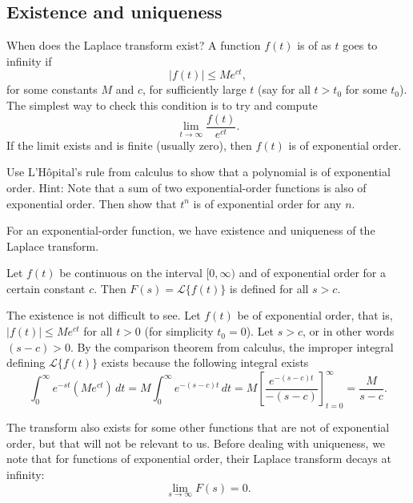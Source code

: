 \subsection{Existence and uniqueness}

When does the Laplace transform exist?  A function $f(t)$ is of
\emph{} as $t$ goes to infinity if
\begin{equation*}
\lvert f(t) \rvert \leq M e^{ct} ,
\end{equation*}
for some constants $M$ and $c$, for
sufficiently large $t$ (say for all $t > t_0$ for some $t_0$).  The simplest
way to check this condition is to try and compute
\begin{equation*}
\lim_{t\to \infty} \frac{f(t)}{e^{ct}} .
\end{equation*}
If the limit exists and is finite (usually zero), then $f(t)$ is of
exponential order.

\begin{exercise}
Use L'H\^{o}pital's rule from calculus to show that a polynomial is of
exponential order.  Hint: Note that a sum of two exponential-order functions
is also of exponential order.  Then show that $t^n$ is of exponential order
for any $n$.
\end{exercise}

For an exponential-order function, we have existence and uniqueness of the
Laplace transform.

\begin{theorem}[Existence]
Let $f(t)$ be continuous on the interval $[0,\infty)$ and of exponential order for a certain
constant $c$.  Then $F(s) = \mathcal{L} \bigl\{ f(t) \bigr\}$ is defined for
all $s > c$.
\end{theorem}

The existence is not difficult to see.  Let $f(t)$ be of exponential order,
that is, $\lvert f(t) \rvert \leq M e^{ct}$ for all $t > 0$ (for simplicity $t_0 = 0$).
Let $s > c$, or in other words $(s-c) > 0$.
By the comparison theorem from calculus, the improper integral defining
$\mathcal{L} \bigl\{ f(t) \bigr\}$ exists because the following integral exists
\begin{equation*}
\int_0^\infty e^{-st} ( M e^{ct} ) \,dt
=
M \int_0^\infty e^{-(s-c)t} \,dt = M \left[ \frac{e^{-(s-c)t}}{-(s-c)}
\right]_{t=0}^\infty = \frac{M}{s-c} .
\end{equation*}

The transform also exists for some other functions
that are not of exponential
order, but that will not be relevant to us.
Before dealing with uniqueness,
we note that for functions of exponential order, their
Laplace transform decays at infinity:
\begin{equation*}
\lim_{s\to\infty} F(s) = 0 .
\end{equation*}

